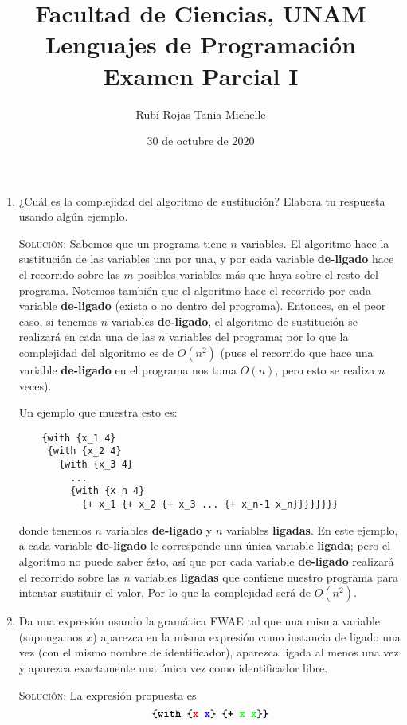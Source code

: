\documentclass[letterpaper,11pt]{article}
\title{Facultad de Ciencias, UNAM \\ 
       Lenguajes de Programación \\ 
       Examen Parcial I}
\author{Rubí Rojas Tania Michelle }
\date{30 de octubre de 2020}
\begin{document}
\maketitle

\begin{enumerate}
    \item ¿Cuál es la complejidad del algoritmo de sustitución? Elabora tu 
    respuesta usando algún ejemplo.

    \textsc{Solución:} Sabemos que un programa tiene $n$ variables. El
    algoritmo hace la sustitución de las variables una por una, y por cada
    variable \textbf{de-ligado} hace el recorrido sobre las $m$ posibles
    variables más que haya sobre el resto del programa. Notemos también que 
    el algoritmo hace el recorrido por cada variable \textbf{de-ligado} (exista 
    o no dentro del programa). Entonces, en el peor caso, si tenemos $n$ 
    variables \textbf{de-ligado}, el algoritmo de sustitución se realizará en 
    cada una de las $n$ variables del programa; por lo que la complejidad del 
    algoritmo es de $O(n^2)$ (pues el recorrido que hace una variable 
    \textbf{de-ligado} en el programa nos toma $O(n)$, pero esto se realiza $n$
    veces).

    Un ejemplo que muestra esto es:
    \begin{verbatim}
    {with {x_1 4} 
     {with {x_2 4} 
       {with {x_3 4} 
         ...
         {with {x_n 4} 
           {+ x_1 {+ x_2 {+ x_3 ... {+ x_n-1 x_n}}}}}}}}
    \end{verbatim}

    donde tenemos $n$ variables \textbf{de-ligado} y $n$ variables 
    \textbf{ligadas}. En este ejemplo, a cada variable \textbf{de-ligado} le 
    corresponde una única variable \textbf{ligada}; pero el algoritmo no puede 
    saber ésto, así que por cada variable \textbf{de-ligado} realizará el 
    recorrido sobre las $n$ variables \textbf{ligadas} que contiene nuestro 
    programa para intentar sustituir el valor. Por lo que la complejidad será 
    de $O(n^2)$. 

    \item Da una expresión usando la gramática FWAE tal que una misma variable
    (supongamos $x$) aparezca en la misma expresión como instancia de ligado una 
    vez (con el mismo nombre de identificador), aparezca ligada al menos una 
    vez y aparezca exactamente una única vez como identificador libre.

    \textsc{Solución:} La expresión propuesta es
    \begin{equation*}
        \texttt{\textbf{\{with \{\textcolor{red}{x} \textcolor{blue}{x}\} 
                               \{+ \textcolor{green}{x} 
                                   \textcolor{green}{x}\}\}}}
    \end{equation*}


\end{enumerate}
\end{document}
